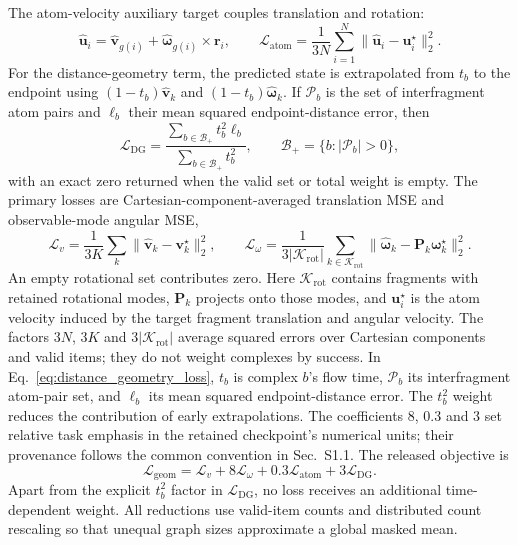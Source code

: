 \documentclass{article}
\renewcommand{\boldsymbol}[1]{\pmb{#1}}
\begin{document}
The atom-velocity auxiliary target couples translation and rotation:
\begin{equation}
\widehat{\mathbf u}_i
=\widehat{\mathbf v}_{g(i)}+
\widehat{\boldsymbol\omega}_{g(i)}\times\mathbf r_i,
\qquad
\mathcal L_{\mathrm{atom}}
=\frac{1}{3N}\sum_{i=1}^{N}
\|\widehat{\mathbf u}_i-\mathbf u_i^\star\|_2^2.
\label{eq:atom_aux_loss}
\end{equation}
For the distance-geometry term, the predicted state is extrapolated from \(t_b\) to the endpoint using \((1-t_b)\widehat{\mathbf v}_k\) and \((1-t_b)\widehat{\boldsymbol\omega}_k\).
If \(\mathcal P_b\) is the set of interfragment atom pairs and \(\ell_b\) their mean squared endpoint-distance error, then
\begin{equation}
\mathcal L_{\mathrm{DG}}
=
\frac{\sum_{b\in\mathcal B_+}t_b^2\ell_b}
     {\sum_{b\in\mathcal B_+}t_b^2},
\qquad
\mathcal B_+=\{b:|\mathcal P_b|>0\},
\label{eq:distance_geometry_loss}
\end{equation}
with an exact zero returned when the valid set or total weight is empty.
The primary losses are Cartesian-component-averaged translation MSE and observable-mode angular MSE,
\begin{equation}
\mathcal L_v=\frac{1}{3K}\sum_k
\|\widehat{\mathbf v}_k-\mathbf v_k^\star\|_2^2,
\qquad
\mathcal L_\omega=\frac{1}{3|\mathcal K_{\mathrm{rot}}|}
\sum_{k\in\mathcal K_{\mathrm{rot}}}
\|\widehat{\boldsymbol\omega}_k-\mathbf P_k\boldsymbol\omega_k^\star\|_2^2.
\label{eq:si_primary_flow_losses}
\end{equation}
An empty rotational set contributes zero.
Here \(\mathcal K_{\mathrm{rot}}\) contains fragments with retained rotational modes, \(\mathbf P_k\) projects onto those modes, and \(\mathbf u_i^\star\) is the atom velocity induced by the target fragment translation and angular velocity. The factors \(3N\), \(3K\) and \(3|\mathcal K_{\mathrm{rot}}|\) average squared errors over Cartesian components and valid items; they do not weight complexes by success. In Eq.~\eqref{eq:distance_geometry_loss}, \(t_b\) is complex \(b\)'s flow time, \(\mathcal P_b\) its interfragment atom-pair set, and \(\ell_b\) its mean squared endpoint-distance error. The \(t_b^2\) weight reduces the contribution of early extrapolations. The coefficients 8, 0.3 and 3 set relative task emphasis in the retained checkpoint's numerical units; their provenance follows the common convention in Sec.~S1.1.
The released objective is
\begin{equation}
\mathcal L_{\mathrm{geom}}
=\mathcal L_v+8\mathcal L_\omega
+0.3\mathcal L_{\mathrm{atom}}+3\mathcal L_{\mathrm{DG}}.
\label{eq:si_total_geometry_loss}
\end{equation}
Apart from the explicit \(t_b^2\) factor in \(\mathcal L_{\mathrm{DG}}\), no loss receives an additional time-dependent weight.
All reductions use valid-item counts and distributed count rescaling so that unequal graph sizes approximate a global masked mean.
\end{document}
